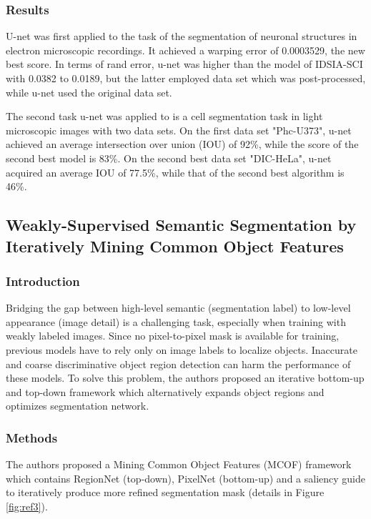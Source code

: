 \documentclass{article}
\begin{document}
\subsubsection{Results}
U-net was first applied to the task of the segmentation of neuronal structures in electron microscopic recordings. It achieved a warping error of 0.0003529, the new best score. In terms of rand error, u-net was higher than the model of IDSIA-SCI with 0.0382 to 0.0189, but the latter employed data set which was post-processed, while u-net used the original data set.

The second task u-net was applied to is a cell segmentation task in light microscopic images with two data sets. On the first data set "Phc-U373", u-net achieved an average intersection over union (IOU) of 92\%, while the score of the second best model is 83\%. On the second best data set "DIC-HeLa", u-net acquired an average IOU of 77.5\%, while that of the second best algorithm is 46\%.

\subsection{Weakly-Supervised Semantic Segmentation by Iteratively Mining Common Object Features \cite{Wang2018WeaklySupervisedSS}}

\subsubsection{Introduction}
Bridging the gap between high-level semantic (segmentation label) to low-level appearance (image detail) is a challenging task, especially when training with weakly labeled images. Since no pixel-to-pixel mask is available for training, previous models have to rely only on image labels to localize objects. Inaccurate and coarse discriminative object region detection can harm the performance of these models. To solve this problem, the authors proposed an iterative bottom-up and top-down framework which alternatively expands object regions and optimizes segmentation network. 

\subsubsection{Methods}
The authors proposed a Mining Common Object Features (MCOF) framework which contains RegionNet (top-down), PixelNet (bottom-up) and a saliency guide to iteratively produce more refined segmentation mask (details in Figure \ref{fig:ref3}).
\end{document}
